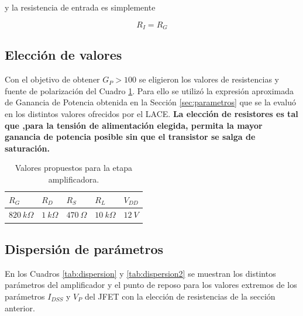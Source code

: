 \documentclass[a4paper, 10pt, spanish]{article}
\begin{document}
y la resistencia de entrada es simplemente

\begin{equation}
R_I = R_G
\end{equation}

\subsection{Elección de valores}\label{sec:valores}

Con el objetivo de obtener $G_P > 100$ se eligieron los valores de resistencias y fuente de polarización del Cuadro \ref{tab:valores}. Para ello se utilizó la expresión aproximada de Ganancia de Potencia obtenida en la Sección \ref{sec:parametros} que se la evaluó en los distintos valores ofrecidos por el LACE. \textbf{La elección de resistores es tal que ,para la tensión de alimentación elegida, permita la mayor ganancia de potencia posible sin que el transistor se salga de saturación.}

\begin{table}[h]
\centering
\begin{tabularx}{0.7\textwidth}{XXXXX}
\hline
 $R_G$  		& $R_D$ 		& $R_S$ 			& $R_L$ 		& $V_{DD}$ \\
 \hline
 $820\ k\Omega$ & $1\ k\Omega$ 	& $470\ \Omega$ 	& $10\ k\Omega$ & $12\ V$ \\
\hline
\end{tabularx}
\caption{Valores propuestos para la etapa amplificadora.}
\label{tab:valores}
\end{table}



\subsection{Dispersión de parámetros}

En los Cuadros \ref{tab:dispersion} y \ref{tab:dispersion2} se muestran los distintos parámetros del amplificador y el punto de reposo para los valores extremos de los parámetros $I_{DSS}$ y $V_P$ del JFET con la elección de resistencias de la sección anterior.
\end{document}
